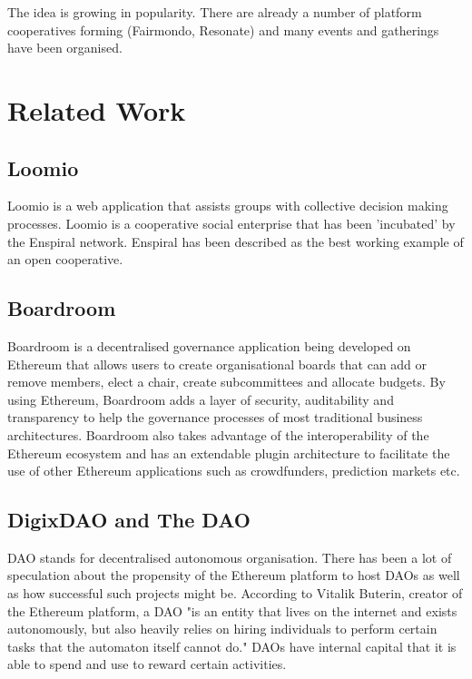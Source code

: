 The idea is growing in popularity. There are already a number of platform cooperatives forming (Fairmondo\cite{Fairmondo}, Resonate\cite{Resonate}) and many events and gatherings have been organised.\\

\section{Related Work}
\label{subsec:RelatedWork}
\subsection{Loomio}
Loomio\cite{Loomio} is a web application that assists groups with collective decision making processes. Loomio is a cooperative social enterprise that has been 'incubated' by the Enspiral network\cite{Enspiral-loomio}. Enspiral has been described as the best working example of an open cooperative\cite{Enspiral}.\\

\subsection{Boardroom}
\label{subsec:boardroom}
Boardroom is a decentralised governance application being developed on Ethereum that allows users to create organisational boards that can add or remove members, elect a chair, create subcommittees and allocate budgets. By using Ethereum, Boardroom adds a layer of security, auditability and transparency to help the governance processes of most traditional business architectures. Boardroom also takes advantage of the interoperability of the Ethereum ecosystem and has an extendable plugin architecture to facilitate the use of other Ethereum applications such as  crowdfunders, prediction markets etc.\\

\subsection{DigixDAO and The DAO}
\label{subsec:DAOs}
DAO stands for decentralised autonomous organisation. There has been a lot of speculation about the propensity of the Ethereum platform to host DAOs as well as how successful such projects might be. According to Vitalik Buterin, creator of the Ethereum platform, a DAO "is an entity that lives on the internet and exists autonomously, but also heavily relies on hiring individuals to perform certain tasks that the automaton itself cannot do."\cite{DAOBlog} DAOs have internal capital that it is able to spend and use to reward certain activities. \\ 

